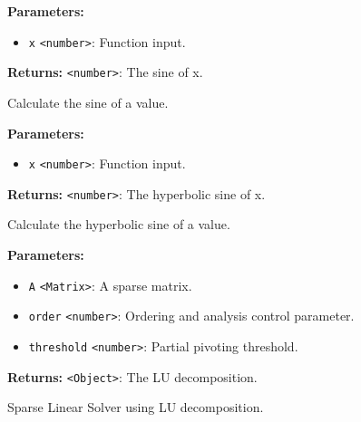 \documentclass[12pt,a4paper]{article}
\begin{document}
\vspace{5mm}
\noindent {}


\noindent \textbf{Parameters:}
\begin{itemize}
  \item \texttt{x} \texttt{<number>}: Function input.
\end{itemize}

\noindent \textbf{Returns:} \texttt{<number>}: The sine of x.

\noindent Calculate the sine of a value.

\vspace{5mm}
\noindent {}


\noindent \textbf{Parameters:}
\begin{itemize}
  \item \texttt{x} \texttt{<number>}: Function input.
\end{itemize}

\noindent \textbf{Returns:} \texttt{<number>}: The hyperbolic sine of x.

\noindent Calculate the hyperbolic sine of a value.

\vspace{5mm}
\noindent {}


\noindent \textbf{Parameters:}
\begin{itemize}
  \item \texttt{A} \texttt{<Matrix>}: A sparse matrix.
  \item \texttt{order} \texttt{<number>}: Ordering and analysis control parameter.
  \item \texttt{threshold} \texttt{<number>}: Partial pivoting threshold.
\end{itemize}

\noindent \textbf{Returns:} \texttt{<Object>}: The LU decomposition.

\noindent Sparse Linear Solver using LU decomposition.

\vspace{5mm}
\noindent {}
\end{document}
